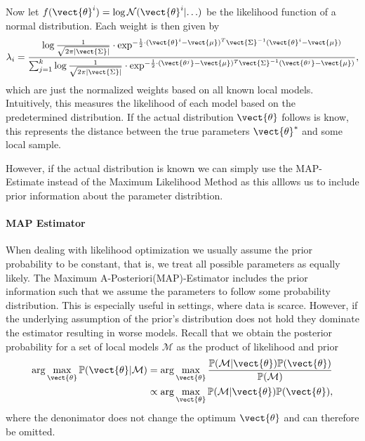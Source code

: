 Now let $f(\vect{\theta}^i) = \log \mathcal{N}(\vect{\theta}^i \lvert \ldots)$ be the likelihood function of a normal distribution.
Each weight is then given by
\begin{equation}
    \lambda_i = \frac{\log \frac{1}{\sqrt{2\pi\lvert \vect{\Sigma} \rvert}} \cdot \exp^{-\frac{1}{2} \cdot (\vect{\theta}^i - \vect{\mu})^T\vect{\Sigma}^{-1}(\vect{\theta}^i - \vect{\mu})}}{\sum_{j=1}^k \log \frac{1}{\sqrt{2\pi\lvert \vect{\Sigma} \rvert}} \cdot \exp^{-\frac{1}{2} \cdot (\vect{\theta^j} - \vect{\mu})^T\vect{\Sigma}^{-1}(\vect{\theta^j} - \vect{\mu})}},
\end{equation}
which are just the normalized weights based on all known local models.
Intuitively, this measures the likelihood of each model based on the predetermined distribution.
If the actual distribution $\vect{\theta}$ follows is know, this represents the distance between the true parameters $\vect{\theta}^*$ and some local sample.

However, if the actual distribution is known we can simply use the MAP-Estimate instead of the Maximum Likelihood Method as this alllows us to include prior information about the parameter distribtion.

\paragraph*{MAP Estimator}
When dealing with likelihood optimization we usually assume the prior probability to be constant, that is, we treat all possible parameters as equally likely.
The Maximum A-Posteriori(MAP)-Estimator includes the prior information such that we assume the parameters to follow some probability distribution.
This is especially useful in settings, where data is scarce.
However, if the underlying assumption of the prior's distribution does not hold they dominate the estimator resulting in worse models.
Recall that we obtain the posterior probability for a set of local models $\mathcal{M}$ as the product of likelihood and prior
\begin{equation}
    \begin{split}
    \arg\max_{\vect{\theta}}\mathbb{P}(\vect{\theta} \lvert \mathcal{M} ) &= \arg\max_{\vect{\theta}} \frac{\mathbb{P}(\mathcal{M}\lvert \vect{\theta}) \mathbb{P}(\vect{\theta}) }{\mathbb{P}(\mathcal{M})} \\
    &\propto  \arg\max_{\vect{\theta}}\mathbb{P}(\mathcal{M}\lvert \vect{\theta}) \mathbb{P}(\vect{\theta})  ,
    \end{split}
\end{equation}
where the denonimator does not change the optimum \wrt $\vect{\theta}$ and can therefore be omitted.

